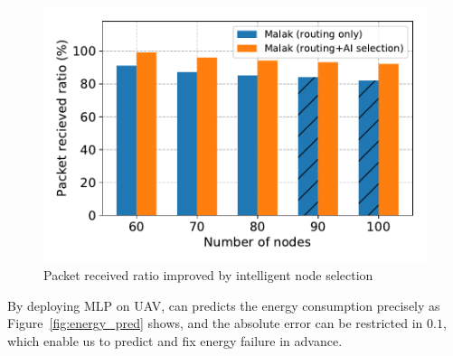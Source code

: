 \begin{figure}[!h]
	\centering
	\includegraphics[width=.95\columnwidth]{Figure/ai_selection}
	\vspace{-0.1in}
	\caption{Packet received ratio improved by intelligent node selection
		\textnormal{
		}}
	\label{fig:ai_selection}
\end{figure}

By deploying MLP on UAV, {\sdn} can predicts the energy consumption precisely as
Figure~\ref{fig:energy_pred} shows, and the absolute error can be restricted in
$0.1$, which enable us to predict and fix energy failure in advance.

